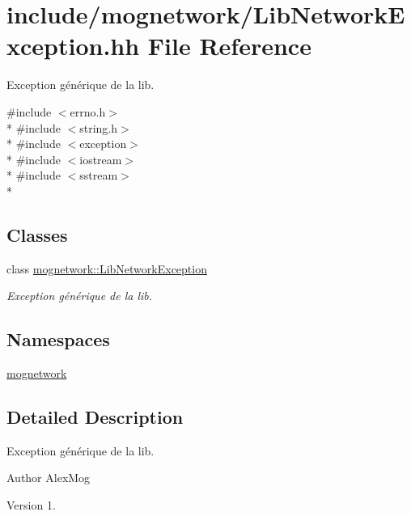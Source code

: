 \hypertarget{_lib_network_exception_8hh}{\section{include/mognetwork/\-Lib\-Network\-Exception.hh File Reference}
\label{_lib_network_exception_8hh}
}


Exception générique de la lib.  


{\ttfamily \#include $<$errno.\-h$>$}\\*
{\ttfamily \#include $<$string.\-h$>$}\\*
{\ttfamily \#include $<$exception$>$}\\*
{\ttfamily \#include $<$iostream$>$}\\*
{\ttfamily \#include $<$sstream$>$}\\*
\subsection*{Classes}
\begin{DoxyCompactItemize}
\item 
class \hyperlink{classmognetwork_1_1_lib_network_exception}{mognetwork\-::\-Lib\-Network\-Exception}
\begin{DoxyCompactList}\small\item\em Exception générique de la lib. \end{DoxyCompactList}\end{DoxyCompactItemize}
\subsection*{Namespaces}
\begin{DoxyCompactItemize}
\item 
\hyperlink{namespacemognetwork}{mognetwork}
\end{DoxyCompactItemize}


\subsection{Detailed Description}
Exception générique de la lib. \begin{DoxyAuthor}{Author}
Alex\-Mog 
\end{DoxyAuthor}
\begin{DoxyVersion}{Version}
1. 
\end{DoxyVersion}
